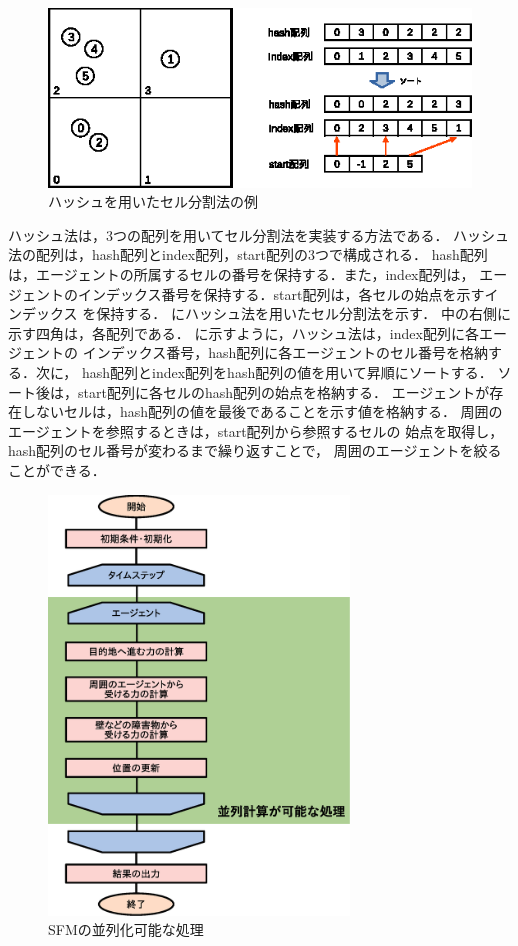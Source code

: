\begin{figure}[t]
 \begin{center}
  \includegraphics[width=11.5cm,clip]{figure/serubunkatu_hash.eps}
  \caption{ハッシュを用いたセル分割法の例}
  \label{fig:hash}
 \end{center}
\end{figure}

ハッシュ法は，3つの配列を用いてセル分割法を実装する方法である．
ハッシュ法の配列は，hash配列とindex配列，start配列の3つで構成される．
hash配列は，エージェントの所属するセルの番号を保持する．また，index配列は，
エージェントのインデックス番号を保持する．start配列は，各セルの始点を示すインデックス
を保持する．
にハッシュ法を用いたセル分割法を示す．
中の右側に示す四角は，各配列である．
に示すように，ハッシュ法は，index配列に各エージェントの
インデックス番号，hash配列に各エージェントのセル番号を格納する．次に，
hash配列とindex配列をhash配列の値を用いて昇順にソートする．
ソート後は，start配列に各セルのhash配列の始点を格納する．
エージェントが存在しないセルは，hash配列の値を最後であることを示す値を格納する．
周囲のエージェントを参照するときは，start配列から参照するセルの
始点を取得し，hash配列のセル番号が変わるまで繰り返すことで，
周囲のエージェントを絞ることができる．


\begin{figure}[t]
 \begin{center}
  \includegraphics[width=8cm,clip]{figure/heiretuka_sfm.eps}
  \caption{SFMの並列化可能な処理}
  \label{fig:sfm_heiretu}
 \end{center}
\end{figure}

